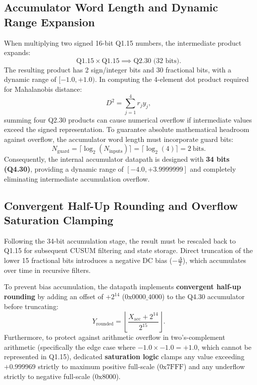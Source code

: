 \documentclass[12pt,a4paper]{report}
\begin{document}
\subsection{Accumulator Word Length and Dynamic Range Expansion}
When multiplying two signed 16-bit Q1.15 numbers, the intermediate product expands:
\begin{equation}
\text{Q1.15} \times \text{Q1.15} \implies \text{Q2.30 (32 bits)}.
\end{equation}
The resulting product has 2 sign/integer bits and 30 fractional bits, with a dynamic range
of $[-1.0, +1.0)$. In computing the 4-element dot product required for Mahalanobis distance:
\begin{equation}
D^2 = \sum_{j=1}^4 r_j y_j,
\end{equation}
summing four Q2.30 products can cause numerical overflow if intermediate values exceed
the signed representation. To guarantee absolute mathematical headroom against overflow,
the accumulator word length must incorporate guard bits:
\begin{equation}
N_{\text{guard}} = \lceil \log_2(N_{\text{inputs}}) \rceil = \lceil \log_2(4) \rceil = 2~\text{bits}.
\end{equation}
Consequently, the internal accumulator datapath is designed with \textbf{34 bits (Q4.30)},
providing a dynamic range of $[-4.0, +3.9999999]$ and completely eliminating intermediate
accumulation overflow.

\subsection{Convergent Half-Up Rounding and Overflow Saturation Clamping}
Following the 34-bit accumulation stage, the result must be rescaled back to Q1.15 for
subsequent CUSUM filtering and state storage. Direct truncation of the lower 15 fractional
bits introduces a negative DC bias ($-\frac{\Delta}{2}$), which accumulates over time in
recursive filters.

To prevent bias accumulation, the datapath implements \textbf{convergent half-up rounding}
by adding an offset of $+2^{14}$ ($\text{0x0000\_4000}$) to the Q4.30 accumulator before
truncating:
\begin{equation}
Y_{\text{rounded}} = \left\lfloor \frac{X_{\text{acc}} + 2^{14}}{2^{15}} \right\rfloor.
\end{equation}
Furthermore, to protect against arithmetic overflow in two's-complement arithmetic
(specifically the edge case where $-1.0 \times -1.0 = +1.0$, which cannot be represented
in Q1.15), dedicated \textbf{saturation logic} clamps any value exceeding $+0.999969$
strictly to maximum positive full-scale ($\text{0x7FFF}$) and any underflow strictly to
negative full-scale ($\text{0x8000}$).
\end{document}
